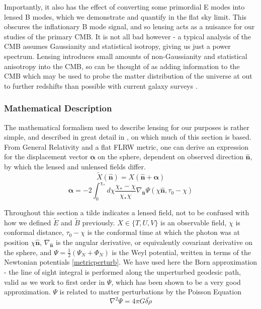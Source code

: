 \documentclass[a4paper,10pt]{article}
\renewcommand{\v}[1]{\mathbf{#1}}
\newcommand{\half}{\frac{1}{2}}
\newcommand{\unit}[1]{\hat{\v{#1}}}
\begin{document}
Importantly, it also has the effect of converting some primordial E modes into lensed B modes, which we demonstrate and quantify in the flat sky limit. This obscures the inflationary B mode signal, and so lensing acts as a nuisance for our studies of the primary CMB. It is not all bad however - a typical analysis of the CMB assumes Gaussianity and statistical isotropy, giving us just a power spectrum. Lensing introduces small amounts of non-Gaussianity and statistical anisotropy into the CMB, so can be thought of as adding information to the CMB which may be used to probe the matter distribution of the universe at out to further redshifts than possible with current galaxy surveys \cite{sloan}.

\subsubsection{Mathematical Description}

The mathematical formalism used to describe lensing for our purposes is rather simple, and described in great detail in \cite{lewis}, on which much of this section is based. From General Relativity and a flat FLRW metric, one can derive an expression for the displacement vector $\boldsymbol{\alpha}$ on the sphere, dependent on observed direction $\unit{n}$, by which the lensed and unlensed fields differ. 
\begin{equation}
\tilde{X}(\unit{n}) = X(\unit{n}+\boldsymbol{\alpha})
\end{equation}
\begin{equation}
\boldsymbol{\alpha} = -2 \int_0^{\chi_*}d\chi \frac{\chi_*-\chi}{\chi_*\chi}\nabla_{\unit{n}}\Psi(\chi\unit{n},\tau_0-\chi)
\end{equation}

Throughout this section a tilde indicates a lensed field, not to be confused with how we defined $\tilde{E}$ and $\tilde{B}$ previously. $X \in \{ T, U, V\}$ is an observable field, $\chi$ is conformal distance, $\tau_0-\chi$ is the conformal time at which the photon was at position $\chi\unit{n}$, $\nabla_{\unit{n}}$ is the angular derivative, or equivalently covariant derivative on the sphere, and $\Psi=\half(\Psi_N+\Phi_N)$ is the Weyl potential, written in terms of the Newtonian potentials \ref{metricperturb}. We have used here the Born approximation - the line of sight integral is performed along the unperturbed geodesic path, valid as we work to first order in $\Psi$, which has been shown to be a very good approximation. $\Psi$ is related to matter perturbations by the Poisson Equation
\begin{equation}
\nabla^2\Psi = 4\pi G\bar{\delta\rho}
\label{poisson}
\end{equation}
\end{document}
